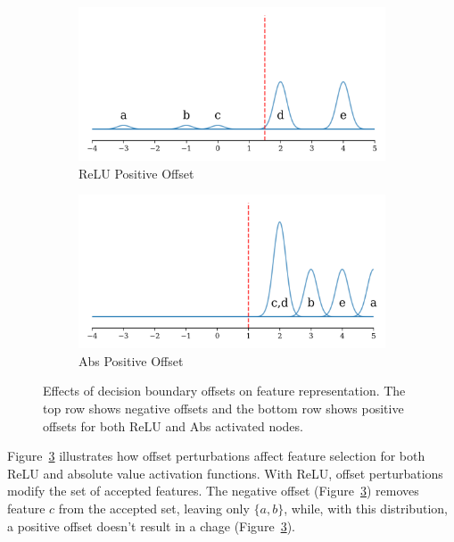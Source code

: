 \begin{figure}[ht]
    \begin{subfigure}[b]{0.49\textwidth}
        \centering
        \includegraphics[width=\textwidth]{images/offset_relu_pos}
        \caption{ReLU Positive Offset}
        \label{fig:relu_offset_up}
    \end{subfigure}
    \hfill
    \begin{subfigure}[b]{0.49\textwidth}
        \centering
        \includegraphics[width=\textwidth]{images/offset_abs_pos}
        \caption{Abs Positive Offset}
        \label{fig:abs_offset_up}
    \end{subfigure}

    \caption{Effects of decision boundary offsets on feature representation. The top row shows negative offsets and the bottom row shows positive offsets for both ReLU and Abs activated nodes.}
    \label{fig:offset_demo}
\end{figure}

Figure~\ref{fig:offset_demo} illustrates how offset perturbations affect feature selection for both ReLU and absolute value activation functions. With ReLU, offset perturbations modify the set of accepted features. The negative offset (Figure~\ref{fig:offset_demo}) removes feature $c$ from the accepted set, leaving only $\{a, b\}$, while, with this distribution, a positive offset doesn't result in a chage (Figure~\ref{fig:offset_demo}). 

